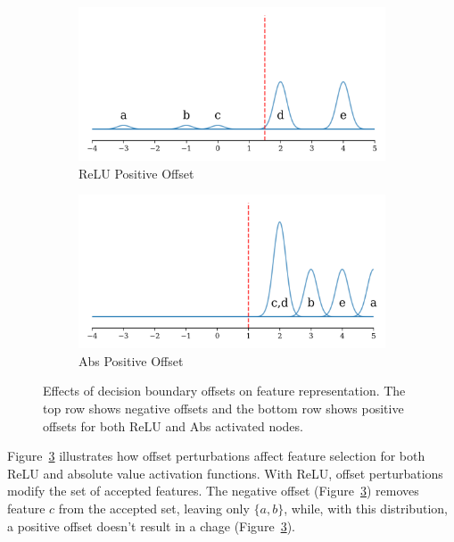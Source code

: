 \begin{figure}[ht]
    \begin{subfigure}[b]{0.49\textwidth}
        \centering
        \includegraphics[width=\textwidth]{images/offset_relu_pos}
        \caption{ReLU Positive Offset}
        \label{fig:relu_offset_up}
    \end{subfigure}
    \hfill
    \begin{subfigure}[b]{0.49\textwidth}
        \centering
        \includegraphics[width=\textwidth]{images/offset_abs_pos}
        \caption{Abs Positive Offset}
        \label{fig:abs_offset_up}
    \end{subfigure}

    \caption{Effects of decision boundary offsets on feature representation. The top row shows negative offsets and the bottom row shows positive offsets for both ReLU and Abs activated nodes.}
    \label{fig:offset_demo}
\end{figure}

Figure~\ref{fig:offset_demo} illustrates how offset perturbations affect feature selection for both ReLU and absolute value activation functions. With ReLU, offset perturbations modify the set of accepted features. The negative offset (Figure~\ref{fig:offset_demo}) removes feature $c$ from the accepted set, leaving only $\{a, b\}$, while, with this distribution, a positive offset doesn't result in a chage (Figure~\ref{fig:offset_demo}). 

